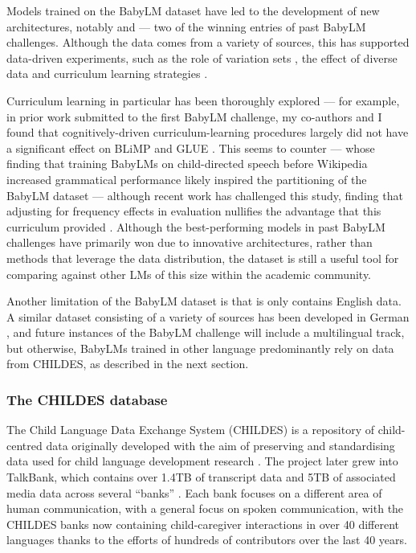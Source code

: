 Models trained on the BabyLM dataset have led to the development of new architectures, notably  \citep{georges-gabriel-charpentier-samuel-2023-layers} and  \citet{charpentier2024gpt} --- two of the winning entries of past BabyLM challenges. Although the data comes from a variety of sources, this has supported data-driven experiments, such as the role of variation sets \citep{haga-etal-2024-babylm}, the effect of diverse data \citep{yam-paek-2024-baby} and curriculum learning strategies \citep[e.g.][]{debenedetto-2023-byte, nguyen-etal-2024-automatic, capone-etal-2024-concretegpt}.

Curriculum learning in particular has been thoroughly explored --- for example, in prior work submitted to the  first BabyLM challenge, my co-authors and I found that cognitively-driven curriculum-learning procedures largely did not have a significant effect on BLiMP and GLUE \citep{martinez-etal-2023-climb}. This seems to counter \citet{huebner-etal-2021-babyberta} --- whose finding that training BabyLMs on child-directed speech before Wikipedia increased grammatical performance likely inspired the partitioning of the BabyLM dataset --- although recent work has challenged this study, finding that adjusting for frequency effects in evaluation nullifies the advantage that this curriculum provided \citep{padovani2025child}. Although the best-performing models in past BabyLM challenges have primarily won due to innovative architectures, rather than methods that leverage the data distribution, the dataset is still a useful tool for comparing against other LMs of this size within the academic community.


Another limitation of the BabyLM dataset is that is only contains English data. A similar dataset consisting of a variety of sources has been developed in German \citep{bunzeck2025constructiondistributionsshapeformal}, and future instances of the BabyLM challenge will include a multilingual track, but otherwise, BabyLMs trained in other language predominantly rely on data from CHILDES, as described in the next section. 

\subsubsection{The CHILDES database}\label{sec:12-childes}

The Child Language Data Exchange System (CHILDES) is a repository of child-centred data originally developed with the aim of preserving and standardising data used for child language development research \citep{macwhinney1985child}. The project later grew into TalkBank, which contains over 1.4TB of transcript data and 5TB of associated media data across several ``banks'' \citep{macwhinney_understanding_2019}. Each bank focuses on a different area of human communication, with a general focus on spoken communication, with the CHILDES banks now containing child-caregiver interactions in over 40 different languages thanks to the efforts of hundreds of contributors over the last 40 years. 

